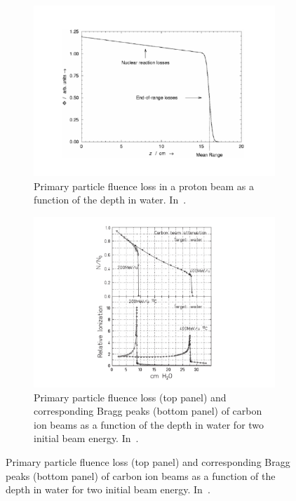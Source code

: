 \begin{figure}
\begin{subfigure}[t]{.49\textwidth}
\hspace{-1cm} \includegraphics[width=1.2\linewidth]{03_GraphicFiles/chapter1_Introduction/primaryLoss.pdf}
\caption{Primary particle fluence loss in a pro\-ton beam as a function of the depth in water. In~\cite{Newhauser2015}.}
\label{chap1::fig::nuclearReacLoss}
\end{subfigure}
\begin{subfigure}[t]{.49\textwidth}
\hspace{-1cm} \includegraphics[width=1.2\linewidth, trim={1.5cm 0 1.5cm 0}, clip = true]{03_GraphicFiles/chapter1_Introduction/primaryLoss_Cion.pdf}
\caption{Primary particle fluence loss (top panel) and corresponding Bragg peaks (bottom panel) of carbon ion beams as a function of the depth in water for two initial beam energy. In~\cite{Haettner2006}.}

\end{subfigure}
\end{figure}
